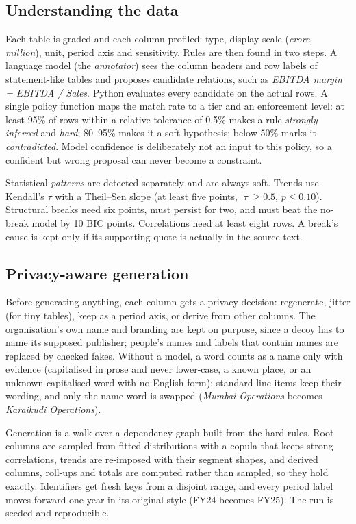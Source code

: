 \documentclass[10pt,twocolumn]{article}
\begin{document}
\subsection{Understanding the data}
Each table is graded and each column profiled: type, display scale (\emph{crore}, \emph{million}),
unit, period axis and sensitivity. Rules are then found in two steps. A language model (the
\emph{annotator}) sees the column headers and row labels of statement-like tables and proposes
candidate relations, such as \textit{EBITDA margin = EBITDA / Sales}. Python evaluates every
candidate on the actual rows. A single policy function maps the match rate to a tier and an
enforcement level: at least 95\% of rows within a relative tolerance of 0.5\% makes a rule
\emph{strongly inferred} and \emph{hard}; 80--95\% makes it a soft hypothesis; below 50\% marks it
\emph{contradicted}. Model confidence is deliberately not an input to this policy, so a confident
but wrong proposal can never become a constraint.

Statistical \emph{patterns} are detected separately and are always soft. Trends use Kendall's
$\tau$ with a Theil--Sen slope (at least five points, $|\tau|\ge 0.5$, $p\le 0.10$). Structural
breaks need six points, must persist for two, and must beat the no-break model by 10 BIC points.
Correlations need at least eight rows. A break's cause is kept only if its supporting quote is
actually in the source text.

\subsection{Privacy-aware generation}
Before generating anything, each column gets a privacy decision: regenerate, jitter (for tiny
tables), keep as a period axis, or derive from other columns. The organisation's own name and
branding are kept on purpose, since a decoy has to name its supposed publisher; people's names
and labels that contain names are replaced by checked fakes. Without a model, a word counts as a
name only with evidence (capitalised in prose and never lower-case, a known place, or an unknown
capitalised word with no English form); standard line items keep their wording, and only the name
word is swapped (\textit{Mumbai Operations} becomes \textit{Karaikudi Operations}).

Generation is a walk over a dependency graph built from the hard rules. Root columns are sampled
from fitted distributions with a copula that keeps strong correlations, trends are re-imposed with
their segment shapes, and derived columns, roll-ups and totals are computed rather than sampled,
so they hold exactly. Identifiers get fresh keys from a disjoint range, and every period label
moves forward one year in its original style (FY24 becomes FY25). The run is seeded and
reproducible.
\end{document}
